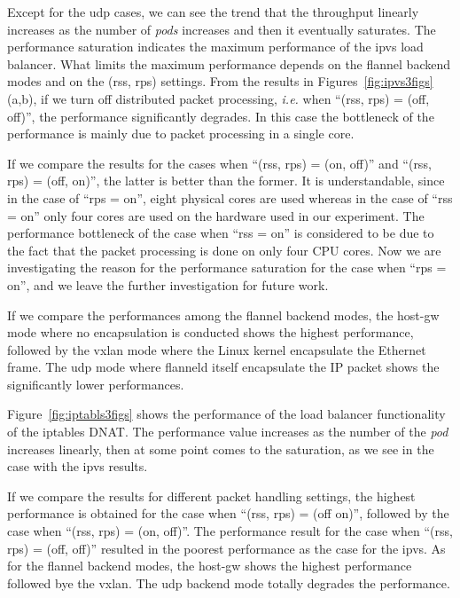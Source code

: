 Except for the udp cases, we can see the trend that the throughput linearly increases 
as the number of {\em pods} increases and then it eventually saturates.
The performance saturation indicates the maximum performance of the ipvs load balancer.
What limits the maximum performance depends on the flannel backend modes and on the (rss, rps) settings.
From the results in Figures~\ref{fig:ipvs3figs}(a,b), if we turn off distributed packet processing,
{\it i.e.} when \enquote{(rss, rps) = (off, off)}, the performance significantly degrades. 
In this case the bottleneck of the performance is mainly due to packet processing in a single core.

If we compare the results for the cases when \enquote{(rss, rps) = (on, off)} and \enquote{(rss, rps) = (off, on)},
the latter is better than the former.
It is understandable, since in the case of \enquote{rps = on}, eight physical cores are used whereas 
in the case of \enquote{rss = on} only four cores are used on the hardware used in our experiment.
The performance bottleneck of the case when \enquote{rss = on} is considered 
to be due to the fact that the packet processing is done on only four CPU cores.
Now we are investigating the reason for the performance saturation for the case when \enquote{rps = on}, 
and we leave the further investigation for future work.

If we compare the performances among the flannel backend modes, 
the host-gw mode where no encapsulation is conducted shows the highest performance,
followed by the vxlan mode where the Linux kernel encapsulate the Ethernet frame.
The udp mode where flanneld itself encapsulate the IP packet shows the significantly lower performances.

Figure~\ref{fig:iptabls3figs} shows the performance of the load balancer 
functionality of the iptables DNAT. 
The performance value increases as the number of the {\em pod} increases linearly, 
then at some point comes to the saturation, as we see in the case with the ipvs results.

If we compare the results for different packet handling settings, the highest performance is 
obtained for the case when \enquote{(rss, rps) = (off on)}, followed by the case when \enquote{(rss, rps) = (on, off)}. 
The performance result for the case when \enquote{(rss, rps) = (off, off)} resulted in the 
poorest performance as the case for the ipvs.
As for the flannel backend modes, the host-gw shows the highest performance followed 
bye the vxlan. The udp backend mode totally degrades the performance.

